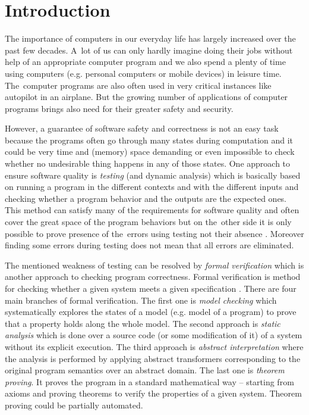 \documentclass[fleqn,11pt]{ExcelAtFIT} %
\affiliation{*%
  \href{mailto:xhrusk16@stud.fit.vutbr.cz}{xhrusk16@stud.fit.vutbr.cz},
  \textit{Faculty of Information Technology, Brno University of Technology}}
\begin{document}
\startdocument



\section{Introduction}

The importance of computers in our everyday life has largely increased over the past few decades.
A~lot of us can only hardly imagine doing their jobs without help of an appropriate computer program
and we also spend a plenty of time using computers (e.g. personal computers or mobile devices) in leisure time.
The~computer programs are also often used in very critical instances like autopilot in an airplane.
But the growing number of applications of computer programs brings also need for their greater safety and security.

However, a guarantee of software safety and correctness is not an easy task
because the programs often go through many states during computation
and it could be very time and (memory) space demanding or even impossible to check whether no undesirable thing
happens in any of those states.
One approach to ensure software quality is \emph{testing} (and dynamic analysis) which is basically based
on running a program in the different contexts and with the different inputs
and checking whether a program behavior and the outputs are the expected ones.
This method can satisfy many of the requirements for software quality and often cover the great space of the program behaviors
but on the~other side it is only possible to prove presence of the~errors using testing not their absence \cite{dijkstra}.
Moreover finding some errors during testing does not mean that all errors are eliminated.

The mentioned weakness of testing can be resolved by \emph{formal verification}
which is another approach to checking program correctness.
Formal verification is method for checking whether a given system meets a given specification \cite{fav:lecture}.
There are four main branches of formal verification.
The first one is \emph{model checking} which systematically explores the states of a model (e.g. model of a program) to
prove that a property holds along the whole model.
The second approach is \emph{static analysis} which is done over a source code (or some modification of it) of a system
without its explicit execution.
The third approach is \emph{abstract interpretation} where the analysis is performed by
applying abstract transformers corresponding to the original program semantics over an abstract domain.
The last one is \emph{theorem proving}.
It proves the program in a standard mathematical way -- starting from axioms and proving theorems to
verify the properties of a given system.
Theorem proving could be partially automated.
\end{document}
